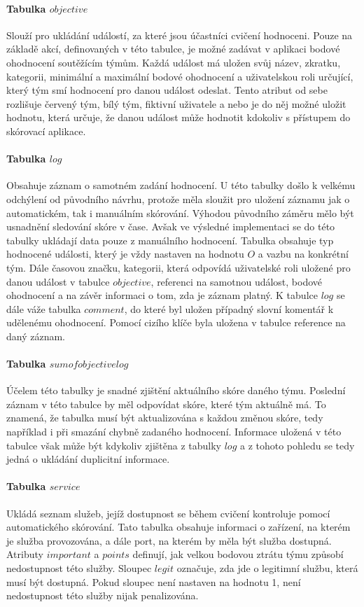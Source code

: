 \documentclass[
  digital,
  twoside,
  table, 
  nolof, 
  nolot
]{fithesis3}
\begin{document}
\paragraph{Tabulka $objective$} Slouží pro ukládání událostí, za které jsou účastníci cvičení hodnoceni. Pouze na základě akcí, definovaných v této tabulce, je možné zadávat v aplikaci bodové ohodnocení soutěžícím týmům. Každá událost má uložen svůj název, zkratku, kategorii, minimální a maximální bodové ohodnocení a uživatelskou roli určující, který tým smí hodnocení pro danou událost odeslat. Tento atribut od sebe rozlišuje červený tým, bílý tým, fiktivní uživatele a nebo je do něj možné uložit hodnotu, která určuje, že danou událost může hodnotit kdokoliv s přístupem do skórovací aplikace.

\paragraph{Tabulka $log$} Obsahuje záznam o samotném zadání hodnocení. U této tabulky došlo k velkému odchýlení od původního návrhu, protože měla sloužit pro uložení záznamu jak o automatickém, tak i manuálním skórování. Výhodou původního záměru mělo být usnadnění sledování skóre v čase. Avšak ve výsledné implementaci se do této tabulky ukládají data pouze z manuálního hodnocení. Tabulka obsahuje typ hodnocené události, který je vždy nastaven na hodnotu $O$ a vazbu na konkrétní tým. Dále časovou značku, kategorii, která odpovídá uživatelské roli uložené pro danou událost v tabulce $objective$, referenci na samotnou událost, bodové ohodnocení a na závěr informaci o tom, zda je záznam platný. K tabulce $log$ se dále váže tabulka $comment$, do které byl uložen případný slovní komentář k udělenému ohodnocení. Pomocí cizího klíče byla uložena v tabulce reference na daný záznam.

\paragraph{Tabulka $sumofobjectivelog$} Účelem této tabulky je snadné zjištění aktuálního skóre daného týmu. Poslední záznam v této tabulce by měl odpovídat skóre, které tým aktuálně má. To znamená, že tabulka musí být aktualizována s každou změnou skóre, tedy například i při smazání chybně zadaného hodnocení. Informace uložená v této tabulce však může být kdykoliv zjištěna z tabulky $log$ a z tohoto pohledu se tedy jedná o ukládání duplicitní informace.

\paragraph{Tabulka $service$} Ukládá seznam služeb, jejíž dostupnost se během cvičení kontroluje pomocí automatického skórování. Tato tabulka obsahuje informaci o zařízení, na kterém je služba provozována, a dále port, na kterém by měla být služba dostupná. Atributy $important$ a $points$ definují, jak velkou bodovou ztrátu týmu způsobí nedostupnost této služby. Sloupec $legit$ označuje, zda jde o legitimní službu, která musí být dostupná. Pokud sloupec není nastaven na hodnotu 1, není nedostupnost této služby nijak penalizována. 
\end{document}
